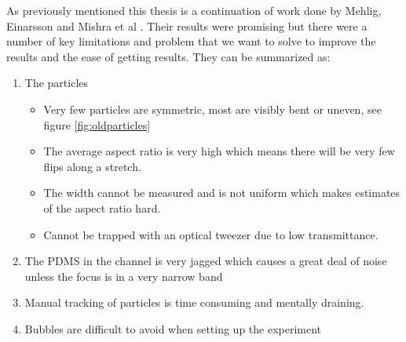 As previously mentioned this thesis is a continuation of work done by Mehlig, Einarsson and Mishra et al \cite{AntonThesis, JonasExperiment, Mishra}. Their results were promising but there were a number of key limitations and problem that we want to solve to improve the results and the ease of getting results. They can be summarized as:
\begin{enumerate}
	\item The particles
	\begin{itemize}
		\item Very few particles are symmetric, most are visibly bent or uneven, see figure \ref{fig:oldparticles}
		\item The average aspect ratio is very high which means there will be very few flips along a stretch.
		\item The width cannot be measured and is not uniform which makes estimates of the aspect ratio hard.
		\item Cannot be trapped with an optical tweezer due to low transmittance.
	\end{itemize}
	\item The PDMS in the channel is very jagged which causes a great deal 
			of noise unless the focus is in a very narrow band
	\item Manual tracking of particles is time consuming and mentally draining.
	\item Bubbles are difficult to avoid when setting up the experiment
\end{enumerate}

